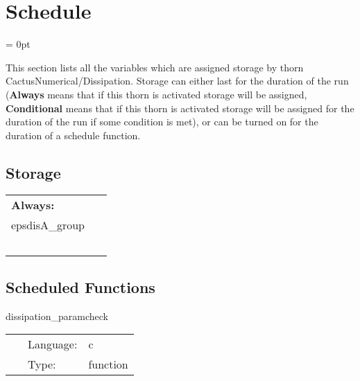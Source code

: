 
\section{Schedule} 


\parskip = 0pt


\noindent This section lists all the variables which are assigned storage by thorn CactusNumerical/Dissipation.  Storage can either last for the duration of the run ({\bf Always} means that if this thorn is activated storage will be assigned, {\bf Conditional} means that if this thorn is activated storage will be assigned for the duration of the run if some condition is met), or can be turned on for the duration of a schedule function.


\subsection*{Storage}

\hspace{5mm}

 \begin{tabular*}{160mm}{ll} 

{\bf Always:}&  ~ \\ 
 epsdisA\_group & ~\\ 
~ & ~\\ 
\end{tabular*} 


\subsection*{Scheduled Functions}
\vspace{5mm}


\hspace{5mm} dissipation\_paramcheck 

\hspace{5mm}{\it check dissipation parameters for consistency } 


\hspace{5mm}

 \begin{tabular*}{160mm}{cll} 
~ & Language:  & c \\ 
~ & Type:  & function \\ 
\end{tabular*} 


\vspace{5mm}


